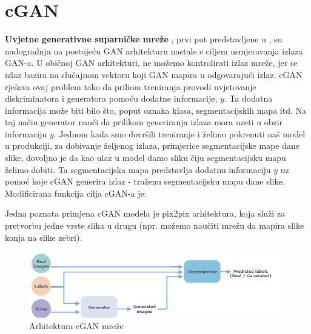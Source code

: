 \section{cGAN}
\textbf{Uvjetne generativne suparničke mreže } , prvi put predstavljene u \citep{cGAN}, su nadogradnja na postojeću GAN arhitekturu nastale s ciljem usmjeravanja izlaza GAN-a. U običnoj GAN arhitekturi, ne možemo kontrolirati izlaz mreže, jer se izlaz bazira na slučajnom vektoru koji GAN mapira u odgovarajući izlaz.  cGAN rješava ovaj problem tako da priliom treniranja provodi uvjetovanje diskriminatora i generatora pomoću dodatne informacije, $y$. Ta dodatna informacija može biti bilo što, poput oznaka klasa, segmentacijskih mapa itd. Na taj način generator nauči da prilikom generiranja izlaza mora uzeti u obzir informaciju $y$. Jednom kada smo dovršili treniranje i želimo pokrenuti naš model u produkciji, za dobivanje željenog izlaza, primjerice segmentacijske mape dane slike, dovoljno je da kao ulaz u model damo sliku čiju segmentacijsku mapu želimo dobiti. Ta segmentacijska mapa predstavlja dodatnu informaciju $y$ uz pomoć koje cGAN generira izlaz - traženu segmentacijsku mapu dane slike.\\

\noindent Modificirana funkcija cilja cGAN-a je:

\begin{myequation}%
\end{myequation}

\noindent Jedna poznata primjena cGAN modela je pix2pix arhitektura, koja služi za pretvorbu jedne vrste slika u drugu (npr. možemo naučiti mrežu da mapira slike konja na slike zebri).\\

\begin{figure}[htb]
\centering
\includegraphics[width=14cm]{slike/cGAN.png}
\caption{Arhitektura cGAN mreže \citep{cGANImage}}
\label{fig:fer-logo}
\end{figure}
\textbf{}


